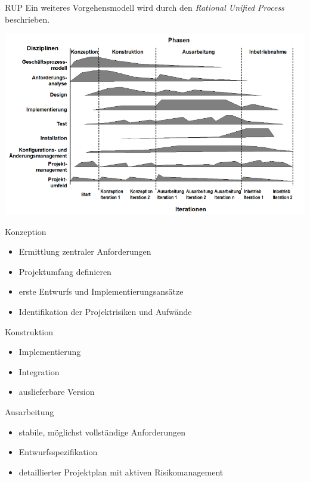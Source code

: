 \begin{defi}{RUP}
    Ein weiteres Vorgehensmodell wird durch den \emph{Rational Unified Process} beschrieben.

    \includegraphics[width=\textwidth]{includes/figures/RUP.png}
\end{defi}

\begin{bonus}{Konzeption}
    \begin{itemize}
        \item Ermittlung zentraler Anforderungen
        \item Projektumfang definieren
        \item erste Entwurfs und Implementierungsansätze
        \item Identifikation der Projektrisiken und Aufwände
    \end{itemize}
\end{bonus}

\begin{bonus}{Konstruktion}
    \begin{itemize}
        \item Implementierung
        \item Integration
        \item auslieferbare Version
    \end{itemize}
\end{bonus}

\begin{bonus}{Ausarbeitung}
    \begin{itemize}
        \item stabile, möglichst vollständige Anforderungen
        \item Entwurfsspezifikation
        \item detaillierter Projektplan mit aktiven Risikomanagement
    \end{itemize}
\end{bonus}

